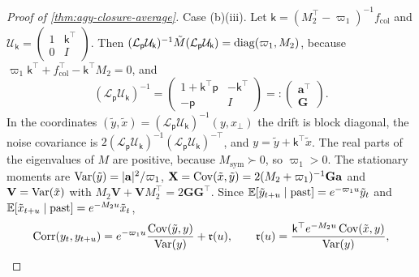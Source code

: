 \begin{proof}[Proof of \cref{thm:agy-closure-average}]
Case (b)(iii). Let $\mathsf k=(M_2^\top-\varpi_1)^{-1}f_{\mathrm{col}}$ and $\mathcal U_{\mathsf k}=\begin{pmatrix}1&\mathsf k^\top\\0&I\end{pmatrix}$. Then $(\mathcal L_{\mathsf p}\mathcal U_{\mathsf k})^{-1}\tilde M(\mathcal L_{\mathsf p}\mathcal U_{\mathsf k})=\operatorname{diag}(\varpi_1,M_2)$, because $\varpi_1\mathsf k^\top+f_{\mathrm{col}}^\top-\mathsf k^\top M_2=0$, and
\begin{equation*}
(\mathcal L_{\mathsf p}\mathcal U_{\mathsf k})^{-1}=\begin{pmatrix}1+\mathsf k^\top\mathsf p&-\mathsf k^\top\\-\mathsf p&I\end{pmatrix}=:\begin{pmatrix}\mathbf a^\top\\\mathbf G\end{pmatrix}.
\end{equation*}
In the coordinates $(\tilde y,\tilde x)=(\mathcal L_{\mathsf p}\mathcal U_{\mathsf k})^{-1}(y,x_\perp)$ the drift is block diagonal, the noise covariance is $2(\mathcal L_{\mathsf p}\mathcal U_{\mathsf k})^{-1}(\mathcal L_{\mathsf p}\mathcal U_{\mathsf k})^{-\top}$, and $y=\tilde y+\mathsf k^\top\tilde x$. The real parts of the eigenvalues of $M$ are positive, because $M_{\mathrm{sym}}\succ0$, so $\varpi_1>0$. The stationary moments are $\operatorname{Var}(\tilde y)=\lvert\mathbf a\rvert^2/\varpi_1$, $\mathbf X=\operatorname{Cov}(\tilde x,\tilde y)=2(M_2+\varpi_1)^{-1}\mathbf G\mathbf a$ and $\mathbf V=\operatorname{Var}(\tilde x)$ with $M_2\mathbf V+\mathbf VM_2^\top=2\mathbf G\mathbf G^\top$. Since $\mathbb{E}[\tilde y_{t+u}\mid\text{past}]=e^{-\varpi_1u}\tilde y_t$ and $\mathbb{E}[\tilde x_{t+u}\mid\text{past}]=e^{-M_2u}\tilde x_t$,
\begin{equation*}
\operatorname{Corr}(y_t,y_{t+u})=e^{-\varpi_1u}\frac{\operatorname{Cov}(\tilde y,y)}{\operatorname{Var}(y)}+\mathfrak r(u),\qquad\mathfrak r(u)=\frac{\mathsf k^\top e^{-M_2u}\operatorname{Cov}(\tilde x,y)}{\operatorname{Var}(y)},
\end{equation*}

\end{proof}
